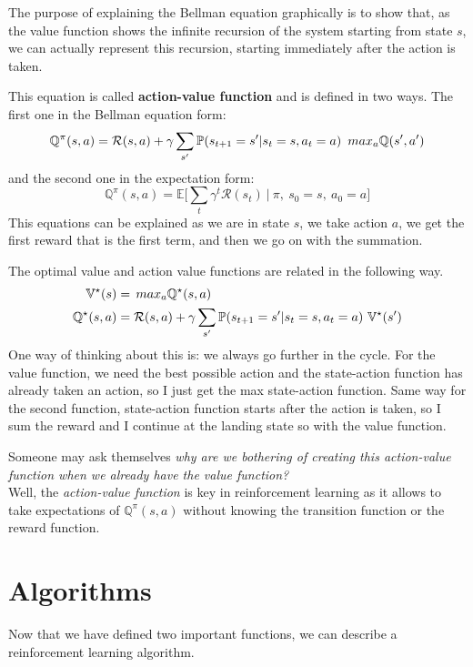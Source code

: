 The purpose of explaining the Bellman equation graphically is to show that, as the value function shows the infinite recursion of the system starting from state $s$, we can actually represent this recursion, starting immediately after the action is taken.

This equation is called \textbf{action-value function} and is defined in two ways. The first one in the Bellman equation form:
\begin{equation}
    \mathbb{Q}^\pi(s, a) = \mathcal{R}(s, a) +  \gamma\sum_{s'} \mathbb{P}(s_{t+1} = \mathnormal{s'} \vert s_t = \mathnormal{s}, a_t = \mathnormal{a}) \ \,max_a\mathbb{Q}(s', a')
\end{equation}
and the second one in the expectation form:
\begin{equation}
    \mathbb{Q}^\pi(s, a) = \mathbb{E} \Big[ \sum_t \gamma^t \mathcal{R}(s_t) \ \vert \ \pi, \ s_0 = s, \ a_0 = a \Big]
\end{equation}
This equations can be explained as we are in state $s$, we take action $a$, we get the first reward that is the first term, and then we go on with the summation.

The optimal value and action value functions are related in the following way.
\begin{align*}
    \mathbb{V}^\star(s) &= \,max_a\mathbb{Q}^\star(s, a) \\
    \mathbb{Q}^\star(s, a) &= \mathcal{R}(s, a) +  \gamma\sum_{s'} \mathbb{P}(s_{t+1} = \mathnormal{s'} \vert s_t = \mathnormal{s}, a_t = \mathnormal{a}) \ \mathbb{V}^\star(s')
\end{align*}
One way of thinking about this is: we always go further in the cycle. For the value function, we need the best possible action and the state-action function has already taken an action, so I just get the max state-action function. Same way for the second function, state-action function starts after the action is taken, so I sum the reward and I continue at the landing state so with the value function.

Someone may ask themselves \textit{why are we bothering of creating this action-value function when we already have the value function?} \\
Well, the \textit{action-value function} is key in reinforcement learning as it allows to take expectations of $\mathbb{Q}^\pi(s,a)$ without knowing the transition function or the reward function.

\section{Algorithms}
Now that we have defined two important functions, we can describe a reinforcement learning algorithm.

